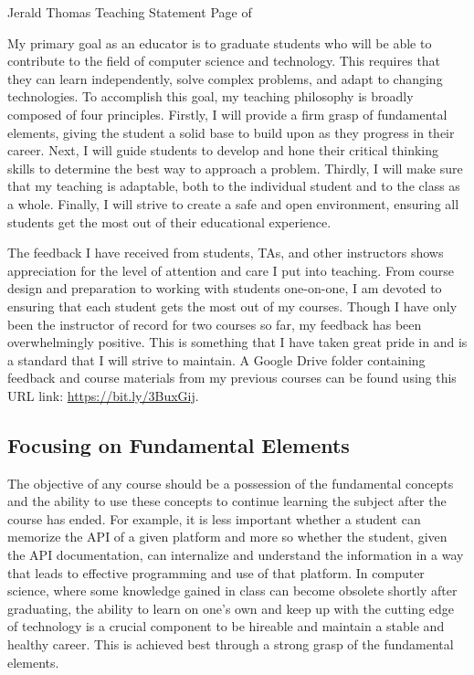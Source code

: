 \newpage

\setcounter{page}{1}
\makecvfooter
  {Jerald Thomas}
  {Teaching Statement}
  {Page \thepage \hspace{1pt} of \pageref{teaching_last}}


\makecvheader[C]
\doublespacing


My primary goal as an educator is to graduate students who will be able to contribute to the field of computer science and technology. This requires that they can learn independently, solve complex problems, and adapt to changing technologies. To accomplish this goal, my teaching philosophy is broadly composed of four principles. Firstly, I will provide a firm grasp of fundamental elements, giving the student a solid base to build upon as they progress in their career. Next, I will guide students to develop and hone their critical thinking skills to determine the best way to approach a problem. Thirdly, I will make sure that my teaching is adaptable, both to the individual student and to the class as a whole. Finally, I will strive to create a safe and open environment, ensuring all students get the most out of their educational experience.

The feedback I have received from students, TAs, and other instructors shows appreciation for the level of attention and care I put into teaching. From course design and preparation to working with students one-on-one, I am devoted to ensuring that each student gets the most out of my courses. Though I have only been the instructor of record for two courses so far, my feedback has been overwhelmingly positive. This is something that I have taken great pride in and is a standard that I will strive to maintain. A Google Drive folder containing feedback and course materials from my previous courses can be found using this URL link: \url{https://bit.ly/3BuxGij}.

\subsection*{Focusing on Fundamental Elements}
\vspace{-0.5cm}
The objective of any course should be a possession of the fundamental concepts and the ability to use these concepts to continue learning the subject after the course has ended. For example, it is less important whether a student can memorize the API of a given platform and more so whether the student, given the API documentation, can internalize and understand the information in a way that leads to effective programming and use of that platform. In computer science, where some knowledge gained in class can become obsolete shortly after graduating, the ability to learn on one's own and keep up with the cutting edge of technology is a crucial component to be hireable and maintain a stable and healthy career. This is achieved best through a strong grasp of the fundamental elements.

